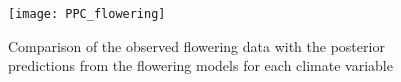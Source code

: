 \documentclass[11pt]{article}
\begin{document}
\begin{figure}[h!]
\texttt{[image: PPC\_flowering]}
\caption{Comparison of the observed  flowering data with the posterior predictions from the flowering  models for each climate variable}
\label{sup:ppc_flowering}
\end{figure}
\clearpage


%
%
\newpage{}



\newpage{}

\newpage{}










\end{document}
